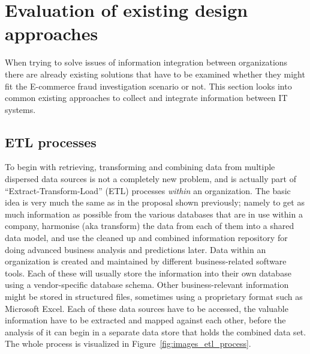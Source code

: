 
\section{Evaluation of existing design approaches}
\label{sec:system_approaches}

When trying to solve issues of information integration between organizations there are already existing solutions that have to be examined whether they might fit the \gls{E-commerce} fraud investigation scenario or not. This section looks into common existing approaches to collect and integrate information between \gls{IT} systems.

\subsection{\gls{ETL} processes}
\label{subsec:etl_process}

To begin with retrieving, transforming and combining data from multiple dispersed data sources is not a completely new problem, and is actually part of ``Extract-Transform-Load'' (\gls{ETL}) processes \emph{within} an organization. The basic idea is very much the same as in the proposal shown previously; namely to get as much information as possible from the various databases that are in use within a company, harmonise (aka transform) the data from each of them into a shared data model, and use the cleaned up and combined information repository for doing advanced business analysis and predictions later. Data within an organization is created and maintained by different business-related software tools. Each of these will usually store the information into their own database using a vendor-specific database schema. Other business-relevant information might be stored in structured files, sometimes using a proprietary format such as Microsoft Excel. Each of these data sources have to be accessed, the valuable information have to be extracted and mapped against each other, before the analysis of it can begin in a separate data store that holds the combined data set. The whole process is visualized in Figure~\ref{fig:images_etl_process}. \@

